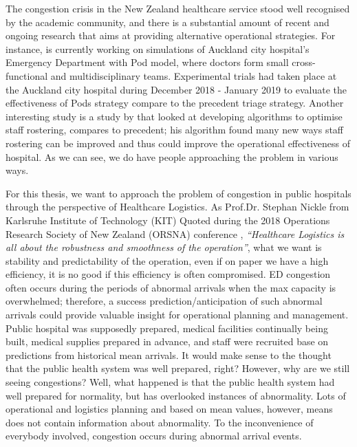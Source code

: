 \newpara

The congestion crisis in the New Zealand healthcare service stood well recognised by the academic community, and there is a substantial amount of recent and ongoing research that aims at providing alternative operational strategies. For instance, \citet{adam2018} is currently working on simulations of Auckland city hospital’s Emergency Department with Pod model, where doctors form small cross-functional and multidisciplinary teams. Experimental trials had taken place at the Auckland city hospital during December 2018 - January 2019 to evaluate the effectiveness of Pods strategy compare to the precedent triage strategy. Another interesting study is a study by \citet{Cleland2018} that looked at developing algorithms to optimise staff rostering, compares to precedent; his algorithm found many new ways staff rostering can be improved and thus could improve the operational effectiveness of hospital. As we can see, we do have people approaching the problem in various ways. 

\newpara

For this thesis, we want to approach the problem of congestion in public hospitals through the perspective of Healthcare Logistics. As Prof.Dr. Stephan Nickle from Karlsruhe Institute of Technology (KIT) Quoted during the 2018 Operations Research Society of New Zealand (ORSNA) conference \citep{Nickle2018}, \textit{“Healthcare Logistics is all about the robustness and smoothness of the operation”}, what we want is stability and predictability of the operation, even if on paper we have a high efficiency, it is no good if this efficiency is often compromised. ED congestion often occurs during the periods of abnormal arrivals when the max capacity is overwhelmed; therefore, a success prediction/anticipation of such abnormal arrivals could provide valuable insight for operational planning and management. Public hospital was supposedly prepared, medical facilities continually being built, medical supplies prepared in advance, and staff were recruited base on predictions from historical mean arrivals. It would make sense to the thought that the public health system was well prepared, right? However, why are we still seeing congestions? Well, what happened is that the public health system had well prepared for normality, but has overlooked instances of abnormality. Lots of operational and logistics planning and based on mean values, however, means does not contain information about abnormality. To the inconvenience of everybody involved, congestion occurs during abnormal arrival events.

